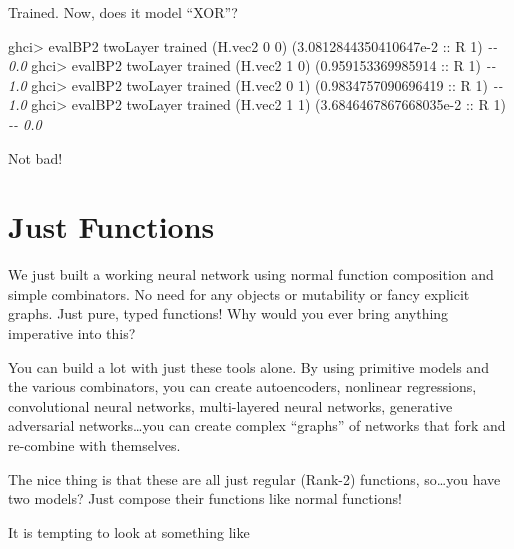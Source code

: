 \documentclass[]{article}
\newenvironment{Shaded}{}{}
\newcommand{\CommentTok}[1]{\textcolor[rgb]{0.38,0.63,0.69}{\textit{#1}}}
\newcommand{\DataTypeTok}[1]{\textcolor[rgb]{0.56,0.13,0.00}{#1}}
\newcommand{\DecValTok}[1]{\textcolor[rgb]{0.25,0.63,0.44}{#1}}
\newcommand{\FloatTok}[1]{\textcolor[rgb]{0.25,0.63,0.44}{#1}}
\newcommand{\NormalTok}[1]{#1}
\newcommand{\OperatorTok}[1]{\textcolor[rgb]{0.40,0.40,0.40}{#1}}
\newcommand{\OtherTok}[1]{\textcolor[rgb]{0.00,0.44,0.13}{#1}}
\begin{document}
Trained. Now, does it model ``XOR''?

\begin{Shaded}
\begin{Highlighting}[]
\NormalTok{ghci}\OperatorTok{>}\NormalTok{ evalBP2 twoLayer trained (H.vec2 }\DecValTok{0} \DecValTok{0}\NormalTok{)}
\NormalTok{(}\FloatTok{3.0812844350410647e{-}2}\OtherTok{ ::} \DataTypeTok{R} \DecValTok{1}\NormalTok{)          }\CommentTok{{-}{-} 0.0}
\NormalTok{ghci}\OperatorTok{>}\NormalTok{ evalBP2 twoLayer trained (H.vec2 }\DecValTok{1} \DecValTok{0}\NormalTok{)}
\NormalTok{(}\FloatTok{0.959153369985914}\OtherTok{ ::} \DataTypeTok{R} \DecValTok{1}\NormalTok{)              }\CommentTok{{-}{-} 1.0}
\NormalTok{ghci}\OperatorTok{>}\NormalTok{ evalBP2 twoLayer trained (H.vec2 }\DecValTok{0} \DecValTok{1}\NormalTok{)}
\NormalTok{(}\FloatTok{0.9834757090696419}\OtherTok{ ::} \DataTypeTok{R} \DecValTok{1}\NormalTok{)             }\CommentTok{{-}{-} 1.0}
\NormalTok{ghci}\OperatorTok{>}\NormalTok{ evalBP2 twoLayer trained (H.vec2 }\DecValTok{1} \DecValTok{1}\NormalTok{)}
\NormalTok{(}\FloatTok{3.6846467867668035e{-}2}\OtherTok{ ::} \DataTypeTok{R} \DecValTok{1}\NormalTok{)          }\CommentTok{{-}{-} 0.0}
\end{Highlighting}
\end{Shaded}

Not bad!

\hypertarget{just-functions}{%
\section{Just Functions}\label{just-functions}}

We just built a working neural network using normal function composition and
simple combinators. No need for any objects or mutability or fancy explicit
graphs. Just pure, typed functions! Why would you ever bring anything imperative
into this?

You can build a lot with just these tools alone. By using primitive models and
the various combinators, you can create autoencoders, nonlinear regressions,
convolutional neural networks, multi-layered neural networks, generative
adversarial networks\ldots you can create complex ``graphs'' of networks that
fork and re-combine with themselves.

The nice thing is that these are all just regular (Rank-2) functions,
so\ldots you have two models? Just compose their functions like normal
functions!

It is tempting to look at something like
\end{document}
